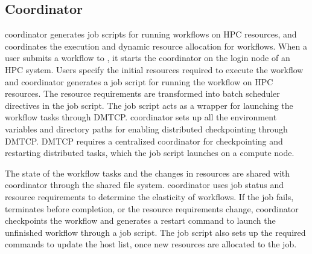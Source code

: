 \vspace{-0.3cm}
\subsection{\systemname Coordinator}
\systemname coordinator generates job scripts for running workflows on
HPC resources, and coordinates the execution and dynamic resource
allocation for workflows. When a user submits a workflow to
\systemname, it starts the coordinator on the login node of an HPC
system. 
Users specify the initial resources
required to execute the workflow and \systemname coordinator generates
a job script for running the workflow on HPC resources. The resource
requirements are transformed into batch scheduler directives in the
job script. The job script acts as a wrapper for launching the workflow
tasks through DMTCP. \systemname coordinator sets up all the
environment variables and directory paths for enabling distributed
checkpointing through DMTCP. DMTCP requires a centralized coordinator
for checkpointing and restarting distributed tasks, which the
job script launches on a compute node.

The state of the workflow tasks and the changes in resources are shared
with \systemname coordinator through the shared file system. \systemname coordinator uses job status and resource
requirements to determine the elasticity of workflows. If the job fails,
terminates before completion, or the resource requirements change,
\systemname coordinator checkpoints the workflow and generates a restart
command to launch the unfinished workflow through a job script. The job script
also sets up the required commands to update the host list, once new
resources are allocated to the job.

\vspace{-0.3cm}
